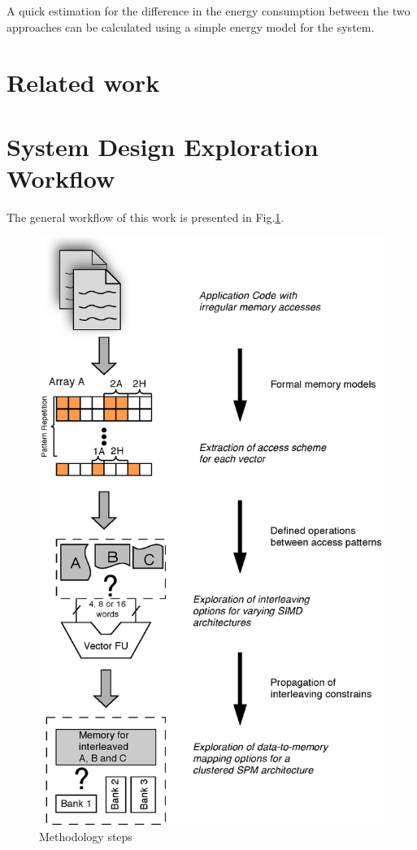 \documentclass[prodmode,acmtodaes]{acmsmall}
\begin{document}
A quick estimation for the difference in the energy consumption between the two approaches can be calculated using a simple energy model for the system.

\section{Related work}

\section{System Design Exploration Workflow}

The general workflow of this work is presented in Fig.\ref{workflow}.

\begin{figure}
\centering
	\label{workflow}
	\caption{Methodology steps}
	\includegraphics[scale = 0.5]{Images/Workflow.eps} 
\end{figure}
\end{document}

